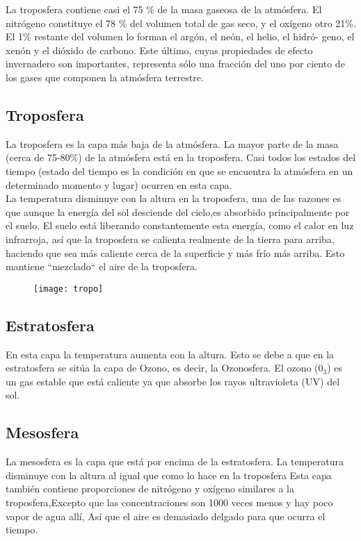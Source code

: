 \documentclass{article}
\begin{document}
\newpage
La troposfera contiene casi el 75 \% de la masa gaseosa de la atmósfera. El
nitrógeno constituye el 78 \% del volumen total de gas seco, y el oxígeno otro
21\%. El 1\% restante del volumen lo forman el argón, el neón, el helio, el hidró-
geno, el xenón y el dióxido de carbono. Este último, cuyas propiedades de efecto
invernadero son importantes, representa sólo una fracción del uno por ciento de
los gases que componen la atmósfera terrestre. \\
\subsection*{Troposfera}
\vspace*{0.1in}
La troposfera es la capa más baja de la atmósfera. La mayor parte de la masa (cerca de 75-80\%) de la atmósfera está en la troposfera. Casi todos los estados del tiempo (estado del tiempo es la condición en que se encuentra la atmósfera en un determinado momento y lugar) ocurren en esta capa. \\ La temperatura disminuye con la altura en la troposfera, una de las razones es que aunque la energía del sol desciende del cielo,es absorbido principalmente por el suelo. El suelo está liberando constantemente esta energía, como el calor en luz infrarroja, así que la troposfera se calienta realmente de la tierra para arriba, haciendo que sea más caliente cerca de la superficie y más frío más arriba. Esto mantiene ``mezclado`` el aire de la troposfera. \\

\begin{figure}[h]
\centering
\texttt{[image: tropo]}
\caption{}
\end{figure}


\newpage

\subsection*{Estratosfera}
\vspace*{0.1in}
En esta capa la temperatura aumenta con la altura. Esto se debe a que en la estratosfera  se sitúa la capa de Ozono, es decir, la Ozonosfera. El ozono ($0_3$) es un gas estable que está caliente ya que absorbe los rayos ultravioleta (UV) del sol.

\subsection*{Mesosfera}
La mesosfera es la capa que está por encima de la estratosfera.
La temperatura disminuye con la altura al igual que como lo hace en la troposfera
Esta capa también contiene proporciones de nitrógeno y oxígeno similares a la troposfera,Excepto que las concentraciones son 1000 veces menos y hay poco vapor de agua allí, Así que el aire es demasiado delgado para que ocurra el tiempo.
\end{document}
